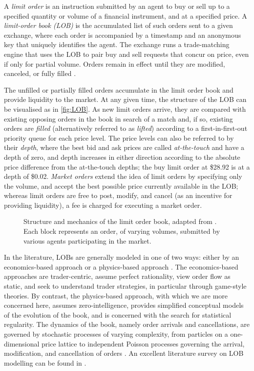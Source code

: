A \emph{limit order} is an instruction submitted by an agent to buy or sell up to a specified quantity or volume of a financial instrument, and at a specified price. A \emph{limit-order book (LOB)} is the accumulated list of such orders sent to a given exchange, where each order is accompanied by a timestamp and an anonymous key that uniquely identifies the agent. The exchange runs a trade-matching engine that uses the LOB to pair buy and sell requests that concur on price, even if only for partial volume. Orders remain in effect until they are modified, canceled, or fully filled \citep{Kyle1989}.

The unfilled or partially filled orders accumulate in the limit order book and provide liquidity to the market. At any given time, the structure of the LOB can be visualised as in \autoref{fig:LOB}. As new limit orders arrive, they are compared with existing opposing orders in the book in search of a match and, if so, existing orders are \emph{filled} (alternatively referred to as \emph{lifted}) according to a first-in-first-out priority queue for each price level. The price levels can also be referred to by their \emph{depth}, where the best bid and ask prices are called \emph{at-the-touch} and have a depth of zero, and depth increases in either direction according to the absolute price difference from the at-the-touch depths; the buy limit order at \$28.92 is at a depth of \$0.02. \emph{Market orders} extend the idea of limit orders by specifying only the volume, and accept the best possible price currently available in the LOB; whereas limit orders are free to post, modify, and cancel (as an incentive for providing liquidity), a fee is charged for executing a market order.

\begin{figure}
  
\caption[Structure and mechanics of the limit order book]{Structure and mechanics of the limit order book, adapted from \citet{Booth15}. Each block represents an order, of varying volumes, submitted by various agents participating in the market.}
\label{fig:LOB}
\end{figure}

In the literature, LOBs are generally modeled in one of two ways: either by an economics-based approach or a physics-based approach \citep{Summary2013}. The economics-based approaches are trader-centric, assume perfect rationality, view order flow as static, and seek to understand trader strategies, in particular through game-style theories. By contrast, the physics-based approach, with which we are more concerned here, assumes zero-intelligence, provides simplified conceptual models of the evolution of the book, and is concerned with the search for statistical regularity. The dynamics of the book, namely order arrivals and cancellations, are governed by stochastic processes of varying complexity, from particles on a one-dimensional price lattice \citep{Bak97} to independent Poisson processes governing the arrival, modification, and cancellation of orders \citep{Cont10}. An excellent literature survey on LOB modelling can be found in \citet{Summary2013}.

